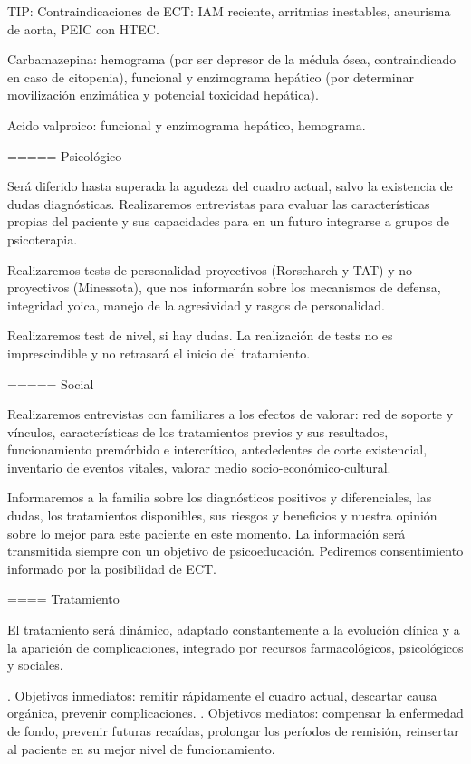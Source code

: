 \documentclass[encares.tex]{subfiles}
\begin{document}
TIP: Contraindicaciones de ECT: IAM reciente, arritmias inestables, aneurisma de aorta, PEIC con HTEC.

Carbamazepina: hemograma (por ser depresor de la médula ósea, contraindicado en caso de citopenia), funcional y enzimograma hepático (por determinar movilización enzimática y potencial toxicidad hepática).

Acido valproico: funcional y enzimograma hepático, hemograma.

===== Psicológico

Será diferido hasta superada la agudeza del cuadro actual, salvo la existencia de dudas diagnósticas. Realizaremos entrevistas para evaluar las características propias del paciente y sus capacidades para en un futuro integrarse a grupos de psicoterapia.

Realizaremos tests de personalidad proyectivos (Rorscharch y TAT) y no proyectivos (Minessota), que nos informarán sobre los mecanismos de defensa, integridad yoica, manejo de la agresividad y rasgos de personalidad.

Realizaremos test de nivel, si hay dudas. La realización de tests no es imprescindible y no retrasará el inicio del tratamiento.

===== Social

Realizaremos entrevistas con familiares a los efectos de valorar: red de soporte y vínculos, características de los tratamientos previos y sus resultados, funcionamiento premórbido e intercrítico, antededentes de corte existencial, inventario de eventos vitales, valorar medio socio-económico-cultural.

Informaremos a la familia sobre los diagnósticos positivos y diferenciales, las dudas, los tratamientos disponibles, sus riesgos y beneficios y nuestra opinión sobre lo mejor para este paciente en este momento. La información será transmitida siempre con un objetivo de psicoeducación. Pediremos consentimiento informado por la posibilidad de ECT.

==== Tratamiento

El tratamiento será dinámico, adaptado constantemente a la evolución clínica y a la aparición de complicaciones, integrado por recursos farmacológicos, psicológicos y sociales.

. Objetivos inmediatos: remitir rápidamente el cuadro actual, descartar causa orgánica, prevenir complicaciones.
. Objetivos mediatos: compensar la enfermedad de fondo, prevenir futuras recaídas, prolongar los períodos de remisión, reinsertar al paciente en su mejor nivel de funcionamiento.
\end{document}
